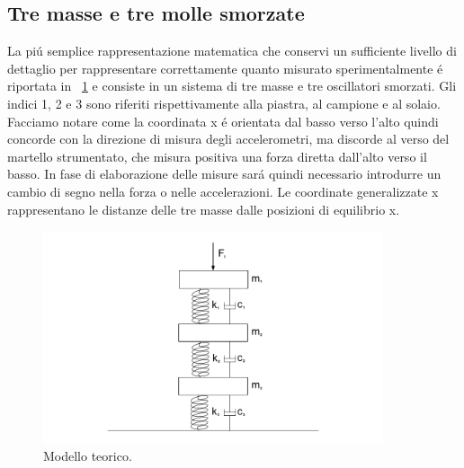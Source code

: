 \documentclass[12pt,a4paper]{article}
\begin{document}
 \subsection{Tre masse e tre molle smorzate}
 	La pi\'u semplice rappresentazione matematica che conservi un sufficiente livello di dettaglio per rappresentare correttamente quanto misurato sperimentalmente \'e riportata in \figurename~\ref{fig:model} e consiste in un sistema di tre masse e tre oscillatori smorzati. Gli indici 1, 2 e 3 sono riferiti rispettivamente alla piastra, al campione e al solaio. Facciamo notare come la coordinata x \'e orientata dal basso verso l'alto quindi concorde con la direzione di misura degli accelerometri, ma discorde al verso del martello strumentato, che misura positiva una forza diretta dall'alto verso il basso. In fase di elaborazione delle misure sar\'a quindi necessario introdurre un cambio di segno nella forza o nelle accelerazioni.
 	Le coordinate generalizzate x rappresentano le distanze delle tre masse dalle posizioni di equilibrio x.
 	\begin{figure}
 		\centering
 		\includegraphics[width=10cm]{model}
 		\caption{Modello teorico.}
 		\label{fig:model}
 	\end{figure}
 	
 	
\end{document}
